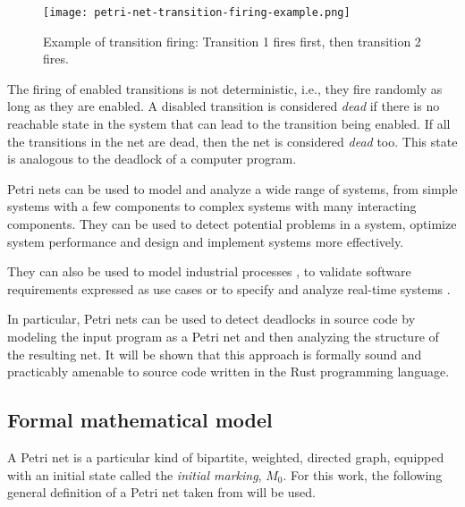 \documentclass[../Thesis.tex]{subfiles}
\begin{document}
\begin{figure}[H]
    \centering
    \texttt{[image: petri-net-transition-firing-example.png]}
    \caption{Example of transition firing: Transition 1 fires first, then transition 2 fires.}
    \label{fig:petri-net-transition-firing-example}
\end{figure}

The firing of enabled transitions is not deterministic, i.e., they fire randomly as long as they are enabled.
A disabled transition is considered \emph{dead}
if there is no reachable state in the system that can lead to the transition being enabled.
If all the transitions in the net are dead, then the net is considered \emph{dead} too.
This state is analogous to the deadlock of a computer program.

Petri nets can be used to model and analyze a wide range of systems,
from simple systems with a few components to complex systems with many interacting components.
They can be used to detect potential problems in a system,
optimize system performance and design and implement systems more effectively.

They can also be used to model industrial processes \cite{aalst1994putting},
to validate software requirements expressed as use cases \cite{silva2004applying}
or to specify and analyze real-time systems \cite{kavi1996specification}.

In particular, Petri nets can be used to detect deadlocks in source code
by modeling the input program as a Petri net and then analyzing the structure of the resulting net.
It will be shown that this approach is formally sound and
practicably amenable to source code written in the Rust programming language.

\subsection{Formal mathematical model}

A Petri net is a particular kind of bipartite, weighted, directed graph,
equipped with an initial state called the \emph{initial marking}, $M_{0}$.
For this work, the following general definition of a Petri net taken from \cite{murata1989} will be used.
\end{document}
